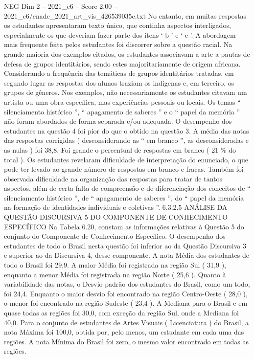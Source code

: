 \begin{textsample}{NEG Dim 2 – 2021\_c6 – Score 2.00 – 2021\_c6/enade\_2021\_art\_vis\_426539035c.txt}
No entanto, em muitas respostas os estudantes apresentaram texto único, que continha aspectos interligados, especialmente os que deveriam fazer parte dos itens ‘ b ’ e ‘ c ’.
A abordagem mais frequente feita pelos estudantes foi discorrer sobre a questão racial.
Na grande maioria dos exemplos citados, os estudantes associavam a arte a pautas de defesa de grupos identitários, sendo estes majoritariamente de origem africana.
Considerando a frequência das temáticas de grupos identitários tratadas, em segundo lugar as respostas dos alunos traziam os indígenas e, em terceiro, os grupos de gêneros.
Nos exemplos, não necessariamente os estudantes citavam um artista ou uma obra específica, mas experiências pessoais ou locais.
Os temas “ silenciamento histórico ”, “ apagamento de saberes ” e o “ papel da memória ” não foram abordados de forma separada e/ou adequada.
O desempenho dos estudantes na questão 4 foi pior do que o obtido na questão 3.
A média das notas das respostas corrigidas ( desconsiderando as “ em branco ”, as desconsideradas e as nulas ) foi 38,8.
Foi grande o percentual de respostas em branco ( 21 \% do total ).
Os estudantes revelaram dificuldade de interpretação do enunciado, o que pode ter levado ao grande número de respostas em branco e fracas.
Também foi observada dificuldade na organização das respostas para tratar de tantos aspectos, além de certa falta de compreensão e de diferenciação dos conceitos de “ silenciamento histórico ”, de “ apagamento de saberes ”, do “ papel da memória na formação de identidades individuais e coletivas ”. 6.3.2.5 ANÁLISE DA QUESTÃO DISCURSIVA 5 DO COMPONENTE DE CONHECIMENTO ESPECÍFICO Na Tabela 6.20, constam as informações relativas à Questão 5 do conjunto do Componente de Conhecimento Específico.
O desempenho dos estudantes de todo o Brasil nesta questão foi inferior ao da Questão Discursiva 3 e superior ao da Discursiva 4, desse componente.
A nota Média dos estudantes de todo o Brasil foi 29,9.
A maior Média foi registrada na região Sul ( 31,9 ), enquanto a menor Média foi registrada na região Norte ( 25,6 ).
Quanto à variabilidade das notas, o Desvio padrão dos estudantes do Brasil, como um todo, foi 24,4.
Enquanto o maior desvio foi encontrado na região Centro-Oeste ( 28,0 ), o menor foi encontrado na região Sudeste ( 23,4 ).
A Mediana para o Brasil e em quase todas as regiões foi 30,0, com exceção da região Sul, onde a Mediana foi 40,0.
Para o conjunto de estudantes de Artes Visuais ( Licenciatura ) do Brasil, a nota Máxima foi 100,0, obtida por, pelo menos, um estudante em cada uma das regiões.
A nota Mínima do Brasil foi zero, o mesmo valor encontrado em todas as regiões.

\end{textsample}
